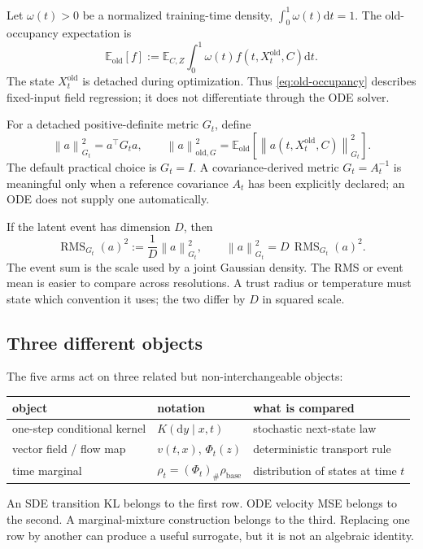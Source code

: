 \documentclass[11pt,a4paper]{article}
\newcommand{\E}{\mathbb{E}}
\newcommand{\norm}[1]{\left\lVert #1 \right\rVert}
\newcommand{\dd}{\mathrm{d}}
\theoremstyle{plain}
\theoremstyle{definition}
\begin{document}
Let $\omega(t)>0$ be a normalized training-time density,
$\int_0^1\omega(t)\dd t=1$.  The old-occupancy expectation is
\begin{equation}
\E_{\mathrm{old}}[f]
  :=
  \E_{C,Z}\int_0^1
  \omega(t)
  f(t,X_t^{\mathrm{old}},C)\dd t .
\label{eq:old-occupancy}
\end{equation}
The state $X_t^{\mathrm{old}}$ is detached during optimization.  Thus
\eqref{eq:old-occupancy} describes fixed-input field regression; it does not differentiate
through the ODE solver.

For a detached positive-definite metric $G_t$, define
\begin{equation}
\norm{a}_{G_t}^2=a^\top G_ta,
\qquad
\norm{a}_{\mathrm{old},G}^2
  =\E_{\mathrm{old}}\!\left[\norm{a(t,X_t^{\mathrm{old}},C)}_{G_t}^2\right].
\label{eq:field-norm}
\end{equation}
The default practical choice is $G_t=I$.  A covariance-derived metric
$G_t=A_t^{-1}$ is meaningful only when a reference covariance $A_t$ has been explicitly declared;
an ODE does not supply one automatically.

If the latent event has dimension $D$, then
\begin{equation}
\operatorname{RMS}_{G_t}(a)^2
  :=\frac{1}{D}\norm{a}_{G_t}^2,
\qquad
\norm{a}_{G_t}^2
  =D\,\operatorname{RMS}_{G_t}(a)^2.
\label{eq:rms-vs-sum}
\end{equation}
The event sum is the scale used by a joint Gaussian density.  The RMS or event mean is easier to
compare across resolutions.  A trust radius or temperature must state which convention it uses;
the two differ by $D$ in squared scale.

\subsection{Three different objects}

The five arms act on three related but non-interchangeable objects:
\begin{center}
\begin{tabular}{@{}lll@{}}
\toprule
object & notation & what is compared\\
\midrule
one-step conditional kernel & $K(\dd y\mid x,t)$ & stochastic next-state law\\
vector field / flow map & $v(t,x)$, $\Phi_t(z)$ & deterministic transport rule\\
time marginal & $\rho_t=(\Phi_t)_\#\rho_{\mathrm{base}}$ & distribution of states at time $t$\\
\bottomrule
\end{tabular}
\end{center}
An SDE transition KL belongs to the first row.  ODE velocity MSE belongs to the second.  A
marginal-mixture construction belongs to the third.  Replacing one row by another can produce a
useful surrogate, but it is not an algebraic identity.
\end{document}
